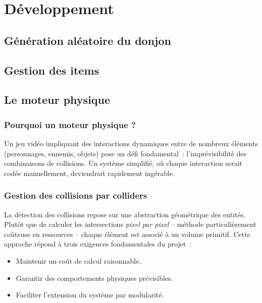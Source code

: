 \documentclass[a4paper,11pt]{article}
\begin{document}
\section{Développement}

\subsection{Génération aléatoire du donjon}

\subsection{Gestion des items}

\subsection{Le moteur physique}

\subsubsection{Pourquoi un moteur physique ?}
\label{sec:moteur_physique}
Un jeu vidéo impliquant des interactions dynamiques entre de nombreux éléments (personnages, ennemis, objets) pose un défi fondamental~: l'imprévisibilité des combinaisons de collisions. Un système simplifié, où chaque interaction serait codée manuellement, deviendrait rapidement ingérable. 

\subsubsection{Gestion des collisions par colliders} 
\label{sec:colliders}
La détection des collisions repose sur une abstraction géométrique des entités. Plutôt que de calculer les intersections \textit{pixel par pixel} -- méthode particulièrement coûteuse en ressources -- chaque élément est associé à un volume primitif. Cette approche répond à trois exigences fondamentales du projet~:

\begin{itemize}
    \item Maintenir un coût de calcul raisonnable.
    \item Garantir des comportements physiques prévisibles.
    \item Faciliter l'extension du système par modularité.
\end{itemize}
\end{document}
